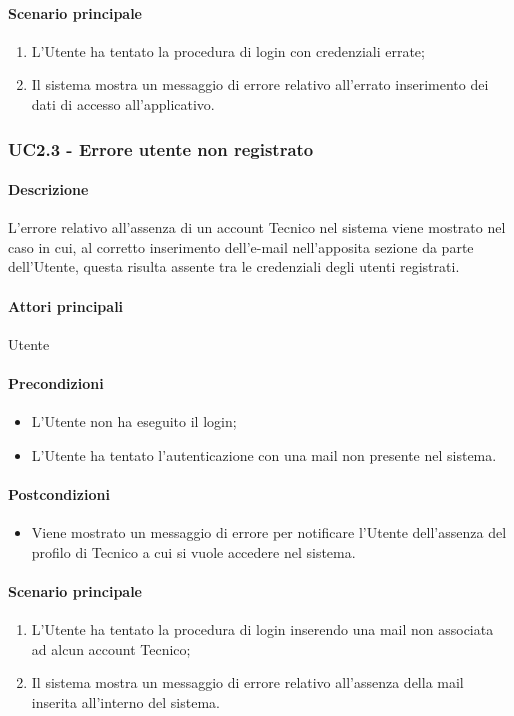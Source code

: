 \paragraph*{Scenario principale}
\begin{enumerate}
  \item L’Utente ha tentato la procedura di login con credenziali errate;
  \item Il sistema mostra un messaggio di errore relativo all’errato inserimento dei dati di accesso all’applicativo.    
\end{enumerate}


\subsubsection{UC2.3 - Errore utente non registrato}\label{UC2point3}
\paragraph*{Descrizione}
L’errore relativo all’assenza di un account Tecnico nel sistema viene mostrato nel caso in cui, al corretto inserimento dell’e-mail nell’apposita sezione da parte dell’Utente, questa risulta assente tra le credenziali degli utenti registrati.

\paragraph*{Attori principali}
Utente

\paragraph*{Precondizioni}
\begin{itemize}
  \item L’Utente non ha eseguito il login;
  \item L’Utente ha tentato l’autenticazione con una mail non presente nel sistema.  
\end{itemize}

\paragraph*{Postcondizioni}
\begin{itemize}
  \item Viene mostrato un messaggio di errore per notificare l’Utente dell’assenza del profilo di Tecnico a cui si vuole accedere nel sistema.
\end{itemize}

\paragraph*{Scenario principale}
\begin{enumerate}
  \item L’Utente ha tentato la procedura di login inserendo una mail non associata ad alcun account Tecnico;
  \item Il sistema mostra un messaggio di errore relativo all’assenza della mail inserita all’interno del sistema.     
\end{enumerate}
